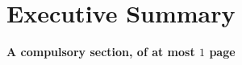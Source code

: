 \documentclass[ %
                    author={Alexander Hill},
                supervisor={Dr. Benjamin Sach},
                    degree={MEng},
                     title={MARMOSET: Multi Agent Real-time Multi-core Online
                     Simulation for Efficient Transportation},
                  subtitle={},
                      type={research},
                      year={2016} ]{dissertation}
\begin{document}


\maketitle


\frontmatter


\makedecl


\tableofcontents
\listoffigures
\listoftables
\listofalgorithms
\lstlistoflistings



\chapter*{Executive Summary}

{\bf A compulsory section, of at most $1$ page}
\vspace{1cm}

\end{document}
